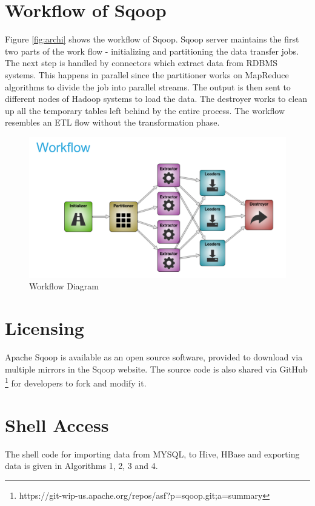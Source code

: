 \documentclass[9pt,twocolumn,twoside]{styles/osajnl}
\begin{document}
\section{Workflow of Sqoop}
Figure \ref{fig:archi} shows the workflow of Sqoop. Sqoop server maintains the first two parts of the work flow -  initializing and partitioning the data transfer jobs. The next step is handled by connectors which extract data from RDBMS systems. This happens in parallel since the partitioner works on MapReduce algorithms to divide the job into parallel streams. The output is then sent to different nodes of Hadoop systems to load the data. The destroyer works to clean up all the temporary tables left behind by the entire process. The workflow resembles an ETL flow without the transformation phase.

\begin{figure}[htbp]
\centering
\includegraphics[width=\linewidth]{images/work.png}
\caption{Workflow Diagram \cite{sqoop-blog}}
\label{fig:work}
\end{figure}
\section{Licensing}
Apache Sqoop is available as an open source software, provided to download via multiple mirrors in the Sqoop website\cite{down}. The source code is also shared via GitHub \footnote{https://git-wip-us.apache.org/repos/asf?p=sqoop.git;a=summary} for developers to fork and modify it. 

\section{Shell Access}
The shell code for importing data from MYSQL, to Hive, HBase and exporting data is given in Algorithms 1, 2, 3 and 4\cite{cloudera}.
\end{document}
